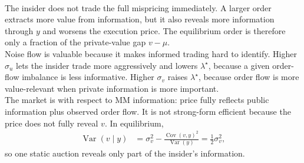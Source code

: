 \documentclass[a4paper,oneside,openany]{book}
\begin{document}
\begin{model}
\par\smallskip\noindent{}\\
The insider does not trade the full mispricing immediately. A larger order extracts more value from information, but it also reveals more information through $y$ and worsens the execution price. The equilibrium order is therefore only a fraction of the private-value gap $v-\mu$.\\
Noise flow is valuable because it makes informed trading hard to identify. Higher $\sigma_u$ lets the insider trade more aggressively and lowers $\lambda^\star$, because a given order-flow imbalance is less informative. Higher $\sigma_v$ raises $\lambda^\star$, because order flow is more value-relevant when private information is more important.\\
The market is  with respect to MM information: price fully reflects public information plus observed order flow. It is not strong-form efficient because the price does not fully reveal $v$. In equilibrium,
\begin{align*}
\operatorname{Var}(v\mid y)&=\sigma_v^2-\frac{\operatorname{Cov}(v,y)^2}{\operatorname{Var}(y)}
=\frac{1}{2}\sigma_v^2,
\end{align*}
so one static auction reveals only part of the insider's information.


\end{model}
\end{document}
